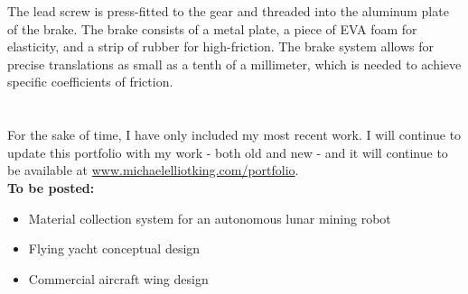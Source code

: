 \documentclass[12pt, landscape]{article}
\begin{document}
The lead screw is press-fitted to the gear and threaded into the aluminum plate of the brake.  The brake consists of a metal plate, a piece of EVA foam for elasticity, and a strip of rubber for high-friction.  The brake system allows for precise translations as small as a tenth of a millimeter, which is needed to achieve specific coefficients of friction.

\clearpage

\section{}
{\LARGE For the sake of time, I have only included my most recent work.  I will continue to update this portfolio with my work - both old and new - and it will continue to be available at \href{http://www/michaelelliotking.com/portfolio}{www.michaelelliotking.com/portfolio}.}\\[20pt]

\textbf{To be posted:}
\begin{itemize}
\item Material collection system for an autonomous lunar mining robot
\item Flying yacht conceptual design
\item Commercial aircraft wing design
\end{itemize}
\end{document}
